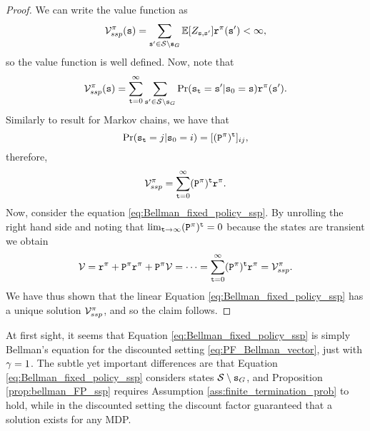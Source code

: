 \begin{proof}
We can write the value function as
\begin{equation*}
    \mathcal{V}_{ssp}^\pi ({\tt s}) = \sum_{{\tt s}' \in  \mathcal{S} \setminus {\tt s}_G} \mathbb{E}[Z_{{\tt s},{\tt s}'}] {\tt r}^{\pi}({\tt s}') < \infty,
\end{equation*}
so the value function is well defined. Now, note that
\begin{equation*}
    \mathcal{V}_{ssp}^\pi ({\tt s}) = \sum_{{\tt t}=0}^\infty \sum_{{\tt s}' \in  \mathcal{S} \setminus {\tt s}_G} \Pr ({\tt s}_{\tt t} = {\tt s}' | {\tt s}_0 = {\tt s}) {\tt r}^{\pi}({\tt s}').
\end{equation*}
Similarly to result for Markov chains, we have that
\begin{equation*}
    \Pr ({\tt s}_{\tt t} = j | {\tt s}_0 = i) =  {[({\tt P}^\pi)^{\tt t}]_{ij}},
\end{equation*}
therefore,
\begin{equation*}
    \mathcal{V}_{ssp}^\pi = \sum_{{\tt t}=0}^\infty ({\tt P}^\pi)^{\tt t} {\tt r}^{\pi}.
\end{equation*}
Now, consider the equation \eqref{eq:Bellman_fixed_policy_ssp}.
By unrolling the right hand side and noting that $\lim_{{\tt t} \to \infty}({\tt P}^\pi)^{\tt t} =0$ because the states are transient we obtain
\begin{equation*}
    \mathcal{V} = {\tt r}^{\pi} + {\tt P}^\pi {\tt r}^{\pi} + {\tt P}^\pi \mathcal{V} = \dots = \sum_{{\tt t}=0}^\infty ({\tt P}^\pi)^{\tt t} {\tt r}^{\pi} = \mathcal{V}_{ssp}^\pi.
\end{equation*}
We have thus shown that the linear Equation \ref{eq:Bellman_fixed_policy_ssp} has a unique solution $\mathcal{V}_{ssp}^\pi$, and so the claim follows.
\end{proof}

\begin{remark}
    At first sight, it seems that Equation \ref{eq:Bellman_fixed_policy_ssp} is simply Bellman's equation for the discounted setting \eqref{eq:PF_Bellman_vector}, just with $\gamma=1$. The subtle yet important differences are that Equation \ref{eq:Bellman_fixed_policy_ssp} considers states $\mathcal{S} \setminus {\tt s}_G$, and Proposition \ref{prop:bellman_FP_ssp} requires Assumption \ref{ass:finite_termination_prob} to hold, while in the discounted setting the discount factor guaranteed that a solution exists for any MDP.
\end{remark}

